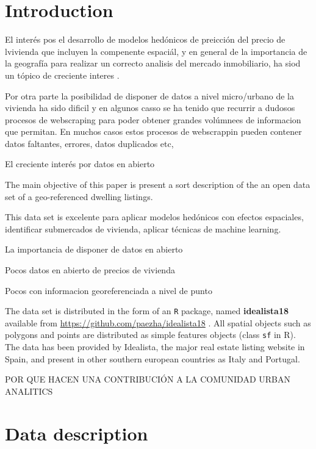 \documentclass[Royal,times,sageh]{sagej}
\begin{document}
\hypertarget{introduction}{%
\section{Introduction}\label{introduction}}

El interés pos el desarrollo de modelos hedónicos de preicción del
precio de lvivienda que incluyen la compenente espaciál, y en general de
la importancia de la geografía para realizar un correcto analisis del
mercado inmobiliario, ha siod un tópico de creciente interes
\citep{lopez2015, crespo2013local}.

Por otra parte la posibilidad de disponer de datos a nivel micro/urbano
de la vivienda ha sido dificil y en algunos casso se ha tenido que
recurrir a dudosos procesos de webscraping para poder obtener grandes
volúmnees de informacion que permitan. En muchos casos estos procesos de
webscrappin pueden contener datos faltantes, errores, datos duplicados
etc,

El creciente interés por datos en abierto \citep{arribas2021}

The main objective of this paper is present a sort description of the an
open data set of a geo-referenced dwelling listings.

This data set is excelente para aplicar modelos hedónicos con efectos
espaciales, identificar submercados de vivienda, aplicar técnicas de
machine learning.

La importancia de disponer de datos en abierto

Pocos datos en abierto de precios de vivienda

Pocos con informacion georeferenciada a nivel de punto

The data set is distributed in the form of an \texttt{R} package, named
\textbf{idealista18} available from
\url{https://github.com/paezha/idealista18} . All spatial objects such
as polygons and points are distributed as simple features objects (class
\texttt{sf} in R). The data has been provided by Idealista, the major
real estate listing website in Spain, and present in other southern
european countries as Italy and Portugal.

POR QUE HACEN UNA CONTRIBUCIÓN A LA COMUNIDAD URBAN ANALITICS

\hypertarget{data-description}{%
\section{Data description}\label{data-description}}
\end{document}
